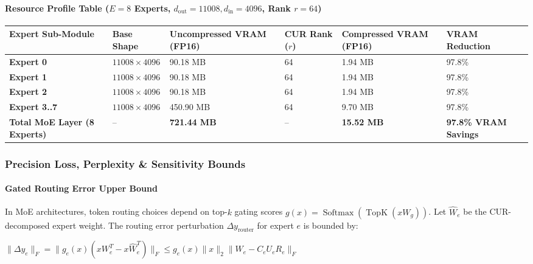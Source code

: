 \paragraph{Resource Profile Table ($E = 8$ Experts, $d_{\text{out}} = 11008, d_{\text{in}} = 4096$, Rank $r = 64$)}

\begin{center}
\begin{adjustbox}{max width=\columnwidth}
\renewcommand{\arraystretch}{1.2}
\begin{tabular}{llllll}
\toprule
Expert Sub-Module & Base Shape & Uncompressed VRAM (FP16) & CUR Rank ($r$) & Compressed VRAM (FP16) & VRAM Reduction \\
\midrule
\textbf{Expert 0} & $11008 \times 4096$ & 90.18 MB & 64 & 1.94 MB & 97.8\% \\
\textbf{Expert 1} & $11008 \times 4096$ & 90.18 MB & 64 & 1.94 MB & 97.8\% \\
\textbf{Expert 2} & $11008 \times 4096$ & 90.18 MB & 64 & 1.94 MB & 97.8\% \\
\textbf{Expert 3..7} & $11008 \times 4096$ & 450.90 MB & 64 & 9.70 MB & 97.8\% \\
\textbf{Total MoE Layer (8 Experts)} & -- & \textbf{721.44 MB} & -- & \textbf{15.52 MB} & \textbf{97.8\% VRAM Savings} \\

\bottomrule
\end{tabular}
\end{adjustbox}
\end{center}

\subsubsection*{Precision Loss, Perplexity \& Sensitivity Bounds}

\paragraph{Gated Routing Error Upper Bound}
In MoE architectures, token routing choices depend on top-$k$ gating scores $g(x) = \operatorname{Softmax}(\operatorname{TopK}(x W_g))$. Let $\hat{W}_e$ be the CUR-decomposed expert weight. The routing error perturbation $\Delta y_{\text{router}}$ for expert $e$ is bounded by:

\begin{center}
\begin{adjustbox}{max width=\columnwidth}
$\displaystyle
\|\Delta y_e\|_F = \|g_e(x) (x W_e^T - x \hat{W}_e^T)\|_F \le g_e(x) \|x\|_2 \|W_e - C_e U_e R_e\|_F
$
\end{adjustbox}
\end{center}

